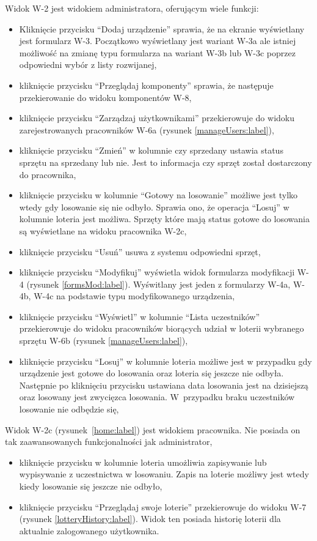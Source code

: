 Widok W-2 jest widokiem administratora, oferującym wiele funkcji:
\begin{itemize}
	\item Kliknięcie przycisku "`Dodaj urządzenie"' sprawia, że na ekranie wyświetlany jest formularz W-3. Początkowo wyświetlany jest wariant W-3a ale istniej możliwość na zmianę typu formularza na wariant  W-3b lub W-3c poprzez odpowiedni wybór z listy rozwijanej,
	\item kliknięcie przycisku "`Przeglądaj komponenty"' sprawia, że następuje przekierowanie do widoku komponentów W-8,
	\item kliknięcie przycisku "`Zarządzaj użytkownikami"' przekierowuje do widoku zarejestrowanych pracowników W-6a (rysunek \ref{manageUsers:label}),
	\item kliknięcie przycisku "`Zmień"' w kolumnie czy sprzedany ustawia status sprzętu na sprzedany lub nie. Jest to informacja czy sprzęt został dostarczony do pracownika,
	\item kliknięcie przycisku w kolumnie "`Gotowy na losowanie"' możliwe jest tylko wtedy gdy losowanie się nie odbyło. Sprawia ono, że operacja "`Losuj"' w kolumnie loteria jest możliwa. Sprzęty które mają status gotowe do losowania są wyświetlane na widoku pracownika W-2c,
	\item kliknięcie przycisku "`Usuń"' usuwa z systemu odpowiedni sprzęt,
	\item kliknięcie przycisku "`Modyfikuj"' wyświetla widok formularza modyfikacji W-4 (rysunek \ref{formsMod:label}). Wyświtlany jest jeden z formularzy W-4a, W-4b, W-4c na podstawie typu modyfikowanego urządzenia,
	\item kliknięcie przycisku "`Wyświetl"' w kolumnie "`Lista uczestników"' przekierowuje do widoku pracowników biorących udział w loterii wybranego sprzętu W-6b (rysunek \ref{manageUsers:label}),
	\item kliknięcie przycisku "`Losuj"' w kolumnie loteria możliwe jest w przypadku gdy urządzenie jest gotowe do losowania oraz loteria się jeszcze nie odbyła. Następnie po kliknięciu przycisku ustawiana data losowania jest na dzisiejszą oraz losowany jest zwycięzca losowania. W~przypadku braku uczestników losowanie nie odbędzie się,
\end{itemize}
Widok W-2c (rysunek~\ref{home:label}) jest widokiem pracownika. Nie posiada on tak zaawansowanych funkcjonalności jak administrator, 
\begin{itemize}
	\item kliknięcie przycisku w kolumnie loteria umożliwia zapisywanie lub wypisywanie z uczestnictwa w losowaniu. Zapis na loterie możliwy jest wtedy kiedy losowanie się jeszcze nie odbyło,
	\item kliknięcie przycisku "`Przeglądaj swoje loterie"' przekierowuje do widoku W-7 (rysunek \ref{lotteryHistory:label}). Widok ten posiada historię loterii dla aktualnie zalogowanego użytkownika.
\end{itemize}


